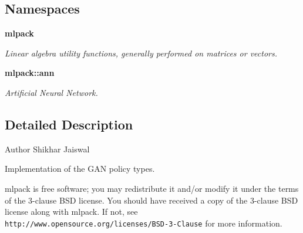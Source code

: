 \subsection*{Namespaces}
\begin{DoxyCompactItemize}
\item 
 \textbf{ mlpack}
\begin{DoxyCompactList}\small\item\em Linear algebra utility functions, generally performed on matrices or vectors. \end{DoxyCompactList}\item 
 \textbf{ mlpack\+::ann}
\begin{DoxyCompactList}\small\item\em Artificial Neural Network. \end{DoxyCompactList}\end{DoxyCompactItemize}


\subsection{Detailed Description}
\begin{DoxyAuthor}{Author}
Shikhar Jaiswal
\end{DoxyAuthor}
Implementation of the G\+AN policy types.

mlpack is free software; you may redistribute it and/or modify it under the terms of the 3-\/clause B\+SD license. You should have received a copy of the 3-\/clause B\+SD license along with mlpack. If not, see {\tt http\+://www.\+opensource.\+org/licenses/\+B\+S\+D-\/3-\/\+Clause} for more information. 
